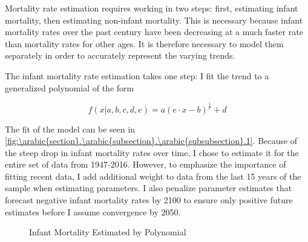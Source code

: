 \documentclass[10pt]{article}
\renewcommand{\thesection}{\arabic{section}}
\renewcommand{\thesubsection}{\thesection.\arabic{subsection}}
\renewcommand{\thesubsubsection}{\thesubsection.\arabic{subsubsection}}
\renewcommand{\subsubsection}[2][]{\oldsubsubsection[#1]{#2}\index{#1}\label{sec:\thesubsubsection}}
\numberwithin{equation}{subsection}
\newcommand*{\FigureDir}{../../graphs}
\begin{document}

\subsubsection{Mortality Rates}

\par Mortality rate estimation requires working in two steps: first, estimating infant mortality, then estimating non-infant mortality. This is necessary because infant mortality rates over the past century have been decreasing at a much faster rate than mortality rates for other ages. It is therefore necessary to model them separately in order to accurately represent the varying trends.

\par The infant mortality rate estimation takes one step: I fit the trend to a generalized polynomial of the form

\begin{equation}
   f(x|a, b, c, d, e) = a (e \cdot x - b)^{\frac{1}{c}} + d
\end{equation}

\par The fit of the model can be seen in \autoref{fig:\thesubsubsection.1}. Because of the steep drop in infant mortality rates over time, I chose to estimate it for the entire set of data from 1947-2016. However, to emphasize the importance of fitting recent data, I add additional weight to data from the last 15 years of the sample when estimating parameters. I also penalize parameter estimates that forecast negative infant mortality rates by 2100 to ensure only positive future estimates before I assume convergence by 2050.

\begin{figure}[!ht]
   \centering
   \caption{\label{fig:\thesubsubsection.1}Infant Mortality Estimated by Polynomial}
\end{figure}
\end{document}
